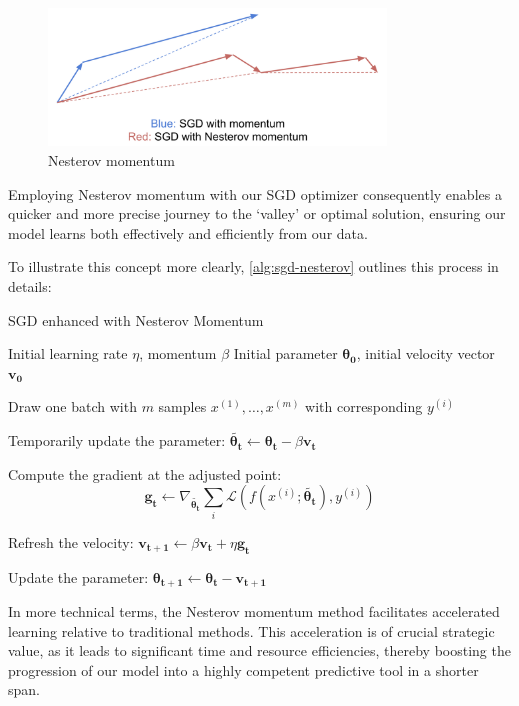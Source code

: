 \begin{figure}[htp]
    \centering
    \includegraphics[width=0.8\textwidth]{./figures/nesterov.png}
    \caption{Nesterov momentum}
    \label{fig:nesterov}
\end{figure}

Employing Nesterov momentum with our SGD optimizer consequently enables a quicker and more precise journey to the `valley' or optimal solution, ensuring our model learns both effectively and efficiently from our data.

To illustrate this concept more clearly, \autoref{alg:sgd-nesterov} outlines this process in details:
\begin{algorithm}[htp]
\caption{SGD enhanced with Nesterov Momentum}\label{alg:sgd-nesterov}
\begin{algorithmic}[1]
\Require Initial learning rate \(\eta\), momentum \(\beta\)
\Require Initial parameter \(\mathbf{\theta_{0}}\), initial velocity vector \(\mathbf{v_{0}}\)
\item Draw one batch with \(m\) samples \({ x^{(1)}, \ldots , x^{(m)} }\) with corresponding \(y^{(i)}\)
\item Temporarily update the parameter: \(\tilde{\mathbf{\theta_{t}}} \leftarrow \mathbf{\theta_{t}} - \beta \mathbf{v_{t}}\)
\item Compute the gradient at the adjusted point:
\[
\mathbf{g_{t}} \leftarrow \nabla_{\tilde{\mathbf{\theta_{t}}}}\sum_{i}\mathcal{L}(f(x^{(i)}; \tilde{\mathbf{\theta_{t}}}), y^{(i)})
\]
\item Refresh the velocity: \(\mathbf{v_{t+1}} \leftarrow \beta\mathbf{v_{t}} + \eta \mathbf{g_{t}}\)
\item Update the parameter: \(\mathbf{\theta_{t + 1}} \leftarrow \mathbf{\theta_{t}} - \mathbf{v_{t + 1}}\)
\EndWhile
\end{algorithmic}
\end{algorithm}

In more technical terms, the Nesterov momentum method facilitates accelerated learning relative to traditional methods. This acceleration is of crucial strategic value, as it leads to significant time and resource efficiencies, thereby boosting the progression of our model into a highly competent predictive tool in a shorter span.

